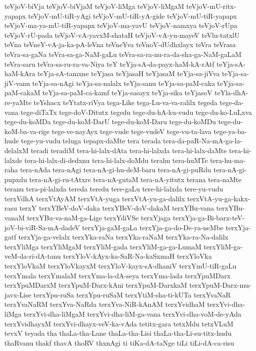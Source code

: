 {teVjoV-biVja
teVjoV-biVjaM
teVjoV-liMga
teVjoV-liMgaM
teVjoV-mU-ritx-yapapx
teVjoV-mU-tiR-yAgi
teVjoV-mU-tiR-yA-gide
teVjoV-mU-tiR-yapapx
teVjoV-ma-ya-mU-tiR-yapapx
teVjoV-ma-yavU
teVjoV-namxya
teVjoV-rUpa
teVjoV-rU-pada
teVjoV-vA-yavxM-shataH
teVjoV-vA-yu-mayeV
teVlu-tatxlU
teVna
teVneY-vA-ja-ka-pA-leVna
teVneYva
teVnoV-dUdhxlayx
teVra
teVrasa
teVra-sa-gaNa
teVra-sa-ga-NaM-gaLu
teVra-sa-ra-nu-ra-da-sha-ga-NaM-gaLaM
teVra-saru
teVra-sa-ru-ra-va-Niya
teY
teYja-sA-da-payx-haM-kA-rAtf
teYja-sA-haM-kAra
teYja-sA-tamxne
teYjasa
teYjasaH
teYjasaM
teYja-sa-jiVva
teYja-sa-jiV-vanu
teYja-sa-nAgi
teYja-sa-nalalx
teYja-sanu
teYja-sa-paM-caka
teYja-sa-paM-cakaM
teYja-sa-paM-ca-kamf
teYja-sasayx
teYja-sika
teYjasoV
teYla-dhA-re-yaMte
teYshacx
teYtatx-riVya
tega-Like
tega-Lu-va-va-ralilx
tegeda
tege-da-vana
tege-diTaTx
tege-doV-Ditutx
tegedu
tege-du-hA-ku-vudu
tege-du-ko-LuLxva
tege-du-koMDa
tege-du-koM-DarU
tege-du-koM-Daru
tege-du-koMDu
tege-du-koM-ba-va-rige
tege-ve-nayAyx
tege-vude
tege-vudeV
tege-vu-ta-lava
tege-ya-ba-hude
tege-yu-vudu
teluga
tepapx-daMte
tera
terada
tera-da-paR-Na-mA-ga-la-delalxM
teradi
teradiM
tera-hi-lalx-dAta
tera-hi-lalxda
tera-hi-lalx-daMte
tera-hi-lalxde
tera-hi-lalx-di-dedxnu
tera-hi-lalx-doMdu
terahu
tera-huMTe
tera-hu-ma-raha
tera-nAda
tera-nAgi
tera-nA-gi-hu-deM-baru
tera-nA-gi-puRdu
tera-nA-gi-pupxdu
tera-nA-gi-ru-tAtxre
tera-nA-gutaM
tera-nA-yitutx
terana
tera-naMte
teranu
tera-pi-lalxda
tereda
teredu
tere-gaLu
tere-hi-lalxda
tere-yu-vudu
terxVdhA
terxVtAyAM
terxVtA-yuga
terxVtA-yu-ga-dalilx
terxVtA-yu-ga-kakx-rasu
terxY
terxYBeV-doV-daka
terxYBeV-doV-dakaM
terxYBu-vana
terxYBu-vanaM
terxYBu-va-naM-ga-Lige
terxYdiVSe
terxYjaga
terxYja-ga-Bi-barx-teV-joV-bi-viR-Sa-mA-dadeV
terxYja-gaM-gaLa
terxYja-ga-do-De-ya-neMbe
terxYja-gatf
terxYja-ga-velalx
terxYka-raNa
terxYka-raNaM
terxYka-ra-Na-dalilx
terxYliMga
terxYliMgaM
terxYliM-gada
terxYliM-ga-ga-LumaM
terxYliM-ga-veM-da-ri-dA-tanu
terxYloV-kAyx-ka-SaR-Na-kaSxmaH
terxYloVka
terxYloVkaM
terxYloVkayxM
terxYloV-kayx-sA-dhaniV
terxYmU-tiR-gaLu
terxYmala
terxYmalaM
terxYma-la-dA-seya
terxYma-lada
terxYpuMDarx
terxYpuMDarxM
terxYpuM-Darx-kAni
terxYpuM-DarxkaM
terxYpuM-Darx-mu-javx-Lise
terxYpu-ruSa
terxYpu-ruSaM
terxYtiM-sha-ti-kUTa
terxYvaNaR
terxYvaNaRM
terxYva-NaRda
terxYva-NiR-kAnAM
terxYvidhaM
terxYvi-dha-liMga
terxYvi-dha-liMgaM
terxYvi-dha-liM-ga-vana
terxYvi-dha-voM-de-yAda
terxYvidhayxM
terxYvi-dhayx-veV-ka-vAda
tetitx-gara
tetxMdu
tetxVLuM
tevxV
teyada
tha
thaLa-tha-Lane
thaLa-tha-Lisi
thaLa-tha-Li-su-titx-hudu
thaRvanu
thakf
thavA
thoRV
thxnAgi
ti
tiKa-dA-taNge
tiLi
tiLi-dA-ca-risu
}
